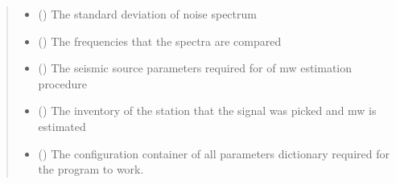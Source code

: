 \documentclass[letterpaper,10pt,english]{sphinxmanual}
\begin{document}
\begin{fulllineitems}
\begin{quote}
\begin{description}
\begin{itemize}
\item {} 
\sphinxAtStartPar
{} (\sphinxstyleliteralemphasis{\sphinxupquote{(}}\sphinxstyleliteralemphasis{\sphinxupquote{)}}) \textendash{} The standard deviation of noise spectrum

\item {} 
\sphinxAtStartPar
{} (\sphinxstyleliteralemphasis{\sphinxupquote{(}}\sphinxstyleliteralemphasis{\sphinxupquote{)}}) \textendash{} The frequencies that the spectra are compared

\item {} 
\sphinxAtStartPar
{} () \textendash{} The seismic source parameters required for of mw estimation procedure

\item {} 
\sphinxAtStartPar
{} () \textendash{} The inventory of the station that the signal was picked and mw is estimated

\item {} 
\sphinxAtStartPar
{} () \textendash{} The configuration container of all parameters dictionary required for the program to work.

\end{itemize}

\end{description}\end{quote}

\sphinxAtStartPar
{}

\end{fulllineitems}

\end{document}
